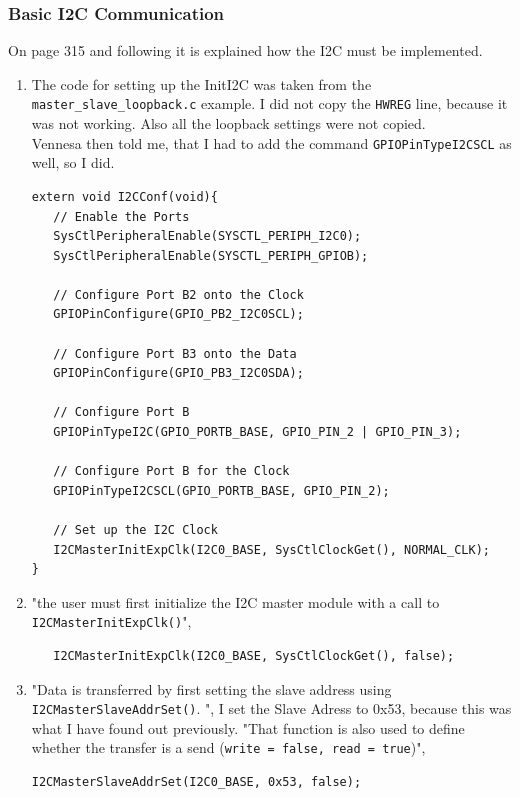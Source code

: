 \documentclass[12pt]{article}
\begin{document}
\subsubsection{Basic I2C Communication}
On page 315 and following it is explained how the I2C must be implemented. \cite[page 315-334]{UG}
\\
\begin{enumerate}
\item The code for setting up the InitI2C was taken from the \texttt{master\_slave\_loopback.c} example.
I did not copy the \texttt{HWREG} line, because it was not working. Also all the loopback settings were not copied. \\
Vennesa then told me, that I had to add the command \texttt{GPIOPinTypeI2CSCL} as well, so I did.
\begin{lstlisting}    
extern void I2CConf(void){
   // Enable the Ports
   SysCtlPeripheralEnable(SYSCTL_PERIPH_I2C0);
   SysCtlPeripheralEnable(SYSCTL_PERIPH_GPIOB);

   // Configure Port B2 onto the Clock
   GPIOPinConfigure(GPIO_PB2_I2C0SCL);

   // Configure Port B3 onto the Data
   GPIOPinConfigure(GPIO_PB3_I2C0SDA);

   // Configure Port B 
   GPIOPinTypeI2C(GPIO_PORTB_BASE, GPIO_PIN_2 | GPIO_PIN_3);

   // Configure Port B for the Clock
   GPIOPinTypeI2CSCL(GPIO_PORTB_BASE, GPIO_PIN_2);

   // Set up the I2C Clock
   I2CMasterInitExpClk(I2C0_BASE, SysCtlClockGet(), NORMAL_CLK);
}
\end{lstlisting} 
\item "the user must first initialize the I2C master
module with a call to \texttt{I2CMasterInitExpClk()}",\cite[page 315]{UG} 
\begin{lstlisting}  
   I2CMasterInitExpClk(I2C0_BASE, SysCtlClockGet(), false);
   \end{lstlisting}    
\cite[page 343]{UG}

\item "Data is transferred by first setting the slave address using \texttt{I2CMasterSlaveAddrSet()}.
",\cite[page 315]{UG} I set the Slave Adress to 0x53, because this was what I have found out previously. "That function
is also used to define whether the transfer is a send (\texttt{write = false, read = true})",\cite[page 315]{UG}
\begin{lstlisting}  
I2CMasterSlaveAddrSet(I2C0_BASE, 0x53, false);
   \end{lstlisting}    
   

\end{enumerate}
\end{document}
